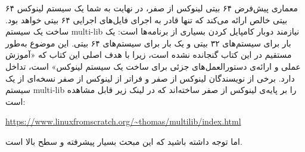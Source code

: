 \documentclass{book}
\begin{document}
\newline
\newline
معماری پیش‌فرض ۶۴ بیتی لینوکس از صفر، در نهایت به شما یک سیستم لینوکس ۶۴ بیتی خالص ارائه می‌کند که تنها قادر به اجرای فایل‌های اجرایی ۶۴ بیتی خواهد بود. ساخت یک سیستم multi-lib نیازمند دوبار کامپایل کردن بسیاری از برنامه‌ها است: یک بار برای سیستم‌های ۳۲ بیتی و یک بار برای سیستم‌های ۶۴ بیتی. این موضوع به‌طور مستقیم در این کتاب گنجانده نشده است، زیرا با هدف اصلی این کتاب که «آموزش عملی و ارائه‌ی دستورالعمل‌های جزئی برای ساخت یک سیستم لینوکس» است، تداخل دارد.
\newline
\newline
برخی از نویسندگان لینوکس از صفر و فراتر از لینوکس از صفر نسخه‌ای از یک سیستم multi-lib را بر پایه‌ی لینوکس از صفر ساخته‌اند که در لینک زیر قابل مشاهده است:

\begin{center}
\url{https://www.linuxfromscratch.org/~thomas/multilib/index.html}
\end{center}

\par
اما توجه داشته باشید که این مبحث بسیار پیشرفته و سطح بالا است.
\end{document}
